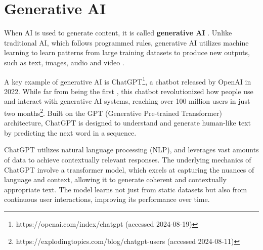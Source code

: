 
\section{Generative AI}
\begin{comment}

Artificial Intelligence, Generative AI (ChatGPT, etc)

What to cover:
    - Mitä tekoäly oikeastaan edes on?
    - What is Generative AI
    - OpenAI releasing ChatGPT to the public in 2022
    - NLP Natural Language Processing
    
What to skip:
    - GPT:n historian (versiot 1, 2, 3, 3.5 jne) eli keskitytään vain GPT versioon 4 ja uudempiiin
    
\end{comment}

When AI is used to generate content, it is called \textbf{generative AI} \citep{goodfellowGenerativeAdversarialNetworks2020}. Unlike traditional AI, which follows programmed rules, generative AI utilizes machine learning to learn patterns from large training datasets to produce new outputs, such as text, images, audio and video \citep{fakhouriAIDrivenSolutionsForSocialEngineeringAttacks2024}.

A key example of generative AI is ChatGPT\footnote{https://openai.com/index/chatgpt (accessed 2024-08-19)}, a chatbot released by OpenAI in 2022. While far from being the first \citep{weizenbaumELIZA1996}, this chatbot revolutionized how people use and interact with generative AI systems, reaching over 100 million users in just two months\footnote{https://explodingtopics.com/blog/chatgpt-users (accessed 2024-08-11)}. Built on the GPT (Generative Pre-trained Transformer) architecture, ChatGPT is designed to understand and generate human-like text by predicting the next word in a sequence.

ChatGPT utilizes natural language processing (NLP), and leverages vast amounts of data to achieve contextually relevant responses. The underlying mechanics of ChatGPT involve a transformer model, which excels at capturing the nuances of language and context, allowing it to generate coherent and contextually appropriate text. The model learns not just from static datasets but also from continuous user interactions, improving its performance over time.